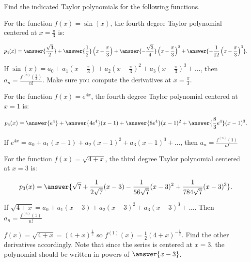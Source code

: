 \documentclass{ximera}
\author{Jim Talamo and Nicholas Hemleben}
\begin{document}
\begin{exercise}
Find the indicated Taylor polynomials for the following functions.

For the function $f(x) = \sin (x)$, the fourth degree Taylor polynomial centered at $x=\frac{\pi}{3}$ is:

\[
p_4(x) =
 \answer{ \frac{\sqrt 3 }{2}}+   \answer{ \frac{1}{2}} \left(x- \frac{\pi}{3}\right) + \answer{- \frac{\sqrt{3}}{4}} \left(x- \frac{\pi}{3}\right)^2 +  \answer{-\frac{1}{12} \left(x- \frac{\pi}{3}\right)^3  }.
 \]

\begin{hint}
If $\sin(x) = a_0 + a_1 \left(x- \frac{\pi}{3}\right) + a_2 \left(x- \frac \pi  3\right)^2 + a_3 \left(x- \frac{\pi}{3}\right)^3 +\ldots $, then $a_n = \frac{f^{(n)} \left(\frac{\pi}{3}\right)}{n!}$.  Make sure you compute the derivatives at $x = \frac{\pi}{3}$.
\end{hint}

\end{exercise}

\begin{exercise}
For the function $f(x) = e^{4x}$, the fourth degree Taylor polynomial centered at $x=1$ is:

\[ 
p_4(x) =
 \answer{e^4}+ \answer{4e^4} (x-1) + \answer{ 8 e^4} (x- 1)^2 +  \answer{ \frac{8}{3} e^4} (x- 1)^3.
 \]
    
\begin{hint}
If $e^{4x} = a_0 + a_1 (x- 1 ) + a_2 (x- 1 )^2 + a_3 (x- 1)^3 +\ldots $, then $a_n = \frac{f^{(n)} (1)} {n!}$
\end{hint}

\end{exercise}

\begin{exercise}
For the function $f(x) =\sqrt{4+x}$, the third degree Taylor polynomial centered at $x=3$ is:

\[
p_3(x) = \answer{\sqrt{7}+ \frac{1}{2 \sqrt{7}} (x-3) - \frac{1}{56 \sqrt{7}} (x- 3)^2 + \frac{1}{784 \sqrt{7}} (x- 3)^3 }  .
\]
     
\begin{hint}
If $\sqrt{4+x} = a_0 + a_1 (x- 3 ) + a_2 (x- 3 )^2 + a_3 (x- 3)^3 +\ldots $.
Then $a_n = \frac{f^{(n)} (1)} {n!}$
\end{hint}

\begin{hint}
$f(x) =  \sqrt{4+x}= (4+x)^{\frac{1} {2}} $ so $f^{(1)} (x) = \frac{1}{2} (4+x)^{- \frac{1} {2}} $.  Find the other derivatives accordingly.  Note that since the series is centered at $x=3$, the polynomial should be written in powers of $\answer{x-3}$. 
\end{hint}
\end{exercise}
\end{document}
